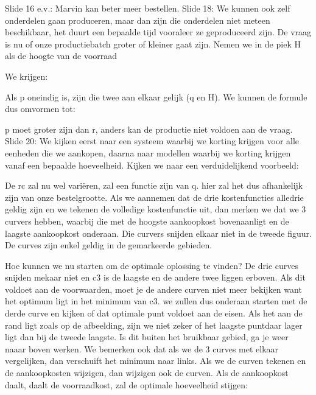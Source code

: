 \documentclass[10pt,a4paper]{report}
\begin{document}
Slide 16 e.v.: Marvin kan beter meer bestellen.
Slide 18: We kunnen ook zelf onderdelen gaan produceren, maar dan zijn die onderdelen niet meteen beschikbaar, het duurt een bepaalde tijd vooraleer ze geproduceerd zijn. De vraag is nu of onze productiebatch groter of kleiner gaat zijn. Nemen we in de piek H als de hoogte van de voorraad 


We krijgen: %















Als p oneindig is, zijn die twee aan elkaar gelijk (q en H).
We kunnen de formule dus omvormen tot:











p moet groter zijn dan r, anders kan de productie niet voldoen aan de vraag.
Slide 20: We kijken eerst naar een systeem waarbij we korting krijgen voor alle eenheden die we aankopen, daarna naar modellen waarbij we korting krijgen vanaf een bepaalde hoeveelheid.
Kijken we naar een verduidelijkend voorbeeld: 









De rc zal nu wel variëren, zal een functie zijn van q. hier zal het dus afhankelijk zijn van onze bestelgrootte.
Als we aannemen dat de drie kostenfuncties alledrie geldig zijn en we tekenen de volledige kostenfunctie uit, dan merken we dat we 3 curvers hebben, waarbij die met de hoogste aankoopkost bovenaanligt en de laagste aankoopkost onderaan. Die curvers snijden elkaar niet in de tweede figuur. De curves zijn enkel geldig in de gemarkeerde gebieden. 


Hoe kunnen we nu starten om de optimale oplossing te vinden? 
De drie curves snijden mekaar niet en c3 is de laagste en de andere twee liggen erboven. Als dit voldoet aan de voorwaarden, moet je de andere curven niet meer bekijken want het optimum ligt in het minimum van c3. we zullen dus onderaan starten met de derde curve en kijken of dat optimale punt voldoet aan de eisen. Als het aan de rand ligt zoals op de afbeelding, zijn we niet zeker of het laagste puntdaar lager ligt dan bij de tweede laagste. Is dit buiten het bruikbaar gebied, ga je weer naaar boven werken.
We bemerken ook dat als we de 3 curves met elkaar vergelijken, dan verschuift het minimum naar links. 
Als we de curven tekenen en de aankoopkosten wijzigen, dan wijzigen ook de curven. Als de aankoopkost daalt, daalt de voorraadkost, zal de optimale hoeveelheid stijgen:
\end{document}
